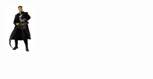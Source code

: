 \documentclass[12pt]{article}
\begin{document}
\newpage
{}

\begin{center}
    \vspace*{2cm}
    \includegraphics[width=0.1\textwidth]{PUNISHER1.PNG}
    \vspace{0.3cm}

    {\Huge \textbf{\textcolor{white}{Punisher Chronological Checklist}}}
\end{center}
\end{document}
